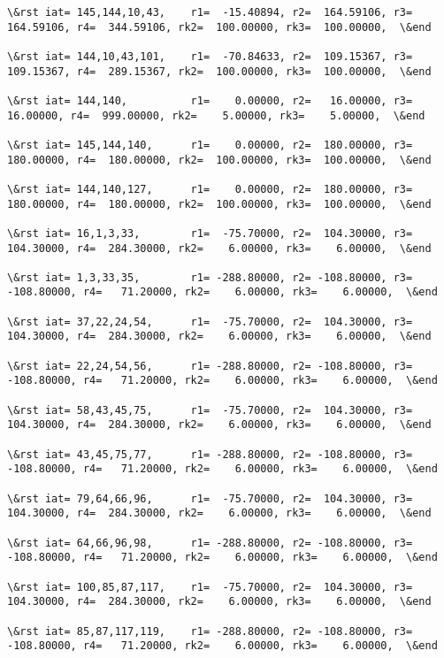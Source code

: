 \documentclass[11pt]{article}
\begin{document}
\begin{Verbatim}[commandchars=\\\{\}]
\&rst iat= 145,144,10,43,    r1=  -15.40894, r2=  164.59106, r3=  164.59106, r4=  344.59106, rk2=  100.00000, rk3=  100.00000,  \&end

\&rst iat= 144,10,43,101,    r1=  -70.84633, r2=  109.15367, r3=  109.15367, r4=  289.15367, rk2=  100.00000, rk3=  100.00000,  \&end

\&rst iat= 144,140,          r1=    0.00000, r2=   16.00000, r3=   16.00000, r4=  999.00000, rk2=    5.00000, rk3=    5.00000,  \&end

\&rst iat= 145,144,140,      r1=    0.00000, r2=  180.00000, r3=  180.00000, r4=  180.00000, rk2=  100.00000, rk3=  100.00000,  \&end

\&rst iat= 144,140,127,      r1=    0.00000, r2=  180.00000, r3=  180.00000, r4=  180.00000, rk2=  100.00000, rk3=  100.00000,  \&end

\&rst iat= 16,1,3,33,        r1=  -75.70000, r2=  104.30000, r3=  104.30000, r4=  284.30000, rk2=    6.00000, rk3=    6.00000,  \&end

\&rst iat= 1,3,33,35,        r1= -288.80000, r2= -108.80000, r3= -108.80000, r4=   71.20000, rk2=    6.00000, rk3=    6.00000,  \&end

\&rst iat= 37,22,24,54,      r1=  -75.70000, r2=  104.30000, r3=  104.30000, r4=  284.30000, rk2=    6.00000, rk3=    6.00000,  \&end

\&rst iat= 22,24,54,56,      r1= -288.80000, r2= -108.80000, r3= -108.80000, r4=   71.20000, rk2=    6.00000, rk3=    6.00000,  \&end

\&rst iat= 58,43,45,75,      r1=  -75.70000, r2=  104.30000, r3=  104.30000, r4=  284.30000, rk2=    6.00000, rk3=    6.00000,  \&end

\&rst iat= 43,45,75,77,      r1= -288.80000, r2= -108.80000, r3= -108.80000, r4=   71.20000, rk2=    6.00000, rk3=    6.00000,  \&end

\&rst iat= 79,64,66,96,      r1=  -75.70000, r2=  104.30000, r3=  104.30000, r4=  284.30000, rk2=    6.00000, rk3=    6.00000,  \&end

\&rst iat= 64,66,96,98,      r1= -288.80000, r2= -108.80000, r3= -108.80000, r4=   71.20000, rk2=    6.00000, rk3=    6.00000,  \&end

\&rst iat= 100,85,87,117,    r1=  -75.70000, r2=  104.30000, r3=  104.30000, r4=  284.30000, rk2=    6.00000, rk3=    6.00000,  \&end

\&rst iat= 85,87,117,119,    r1= -288.80000, r2= -108.80000, r3= -108.80000, r4=   71.20000, rk2=    6.00000, rk3=    6.00000,  \&end


\end{Verbatim}
\end{document}
